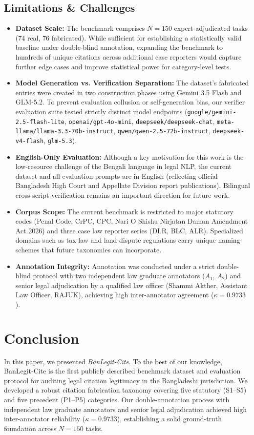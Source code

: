 \documentclass[conference]{IEEEtran}
\begin{document}
\subsection{Limitations \& Challenges}
\begin{itemize}
\item \textbf{Dataset Scale:} The benchmark comprises $N = 150$ expert-adjudicated tasks (74 real, 76 fabricated). While sufficient for establishing a statistically valid baseline under double-blind annotation, expanding the benchmark to hundreds of unique citations across additional case reporters would capture further edge cases and improve statistical power for category-level tests.
\item \textbf{Model Generation vs. Verification Separation:} The dataset's fabricated entries were created in two construction phases using Gemini 3.5 Flash and GLM-5.2. To prevent evaluation collusion or self-generation bias, our verifier evaluation suite tested strictly distinct model endpoints (\texttt{google/gemini-2.5-flash-lite}, \texttt{openai/gpt-4o-mini}, \texttt{deepseek/deepseek-chat}, \texttt{meta-llama/llama-3.3-70b-instruct}, \texttt{qwen/qwen-2.5-72b-instruct}, \texttt{deepseek-v4-flash}, \texttt{glm-5.3}).
\item \textbf{English-Only Evaluation:} Although a key motivation for this work is the low-resource challenge of the Bengali language in legal NLP, the current dataset and all evaluation prompts are in English (reflecting official Bangladesh High Court and Appellate Division report publications). Bilingual cross-script verification remains an important direction for future work.
\item \textbf{Corpus Scope:} The current benchmark is restricted to major statutory codes (Penal Code, CrPC, CPC, Nari O Shishu Nirjatan Daman Amendment Act 2026) and three case law reporter series (DLR, BLC, ALR). Specialized domains such as tax law and land-dispute regulations carry unique naming schemes that future taxonomies can incorporate.
\item \textbf{Annotation Integrity:} Annotation was conducted under a strict double-blind protocol with two independent law graduate annotators ($A_1$, $A_2$) and senior legal adjudication by a qualified law officer (Shammi Akther, Assistant Law Officer, RAJUK), achieving high inter-annotator agreement ($\kappa = 0.9733$).
\end{itemize}

\section{Conclusion}
In this paper, we presented \textit{BanLegit-Cite}. To the best of our knowledge, BanLegit-Cite is the first publicly described benchmark dataset and evaluation protocol for auditing legal citation legitimacy in the Bangladeshi jurisdiction. We developed a robust citation fabrication taxonomy covering five statutory (S1--S5) and five precedent (P1--P5) categories. Our double-annotation process with independent law graduate annotators and senior legal adjudication achieved high inter-annotator reliability ($\kappa = 0.9733$), establishing a solid ground-truth foundation across $N=150$ tasks.
\end{document}
